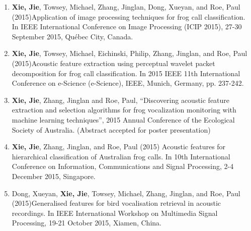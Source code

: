 \begin{enumerate}
\item	\textbf{Xie, Jie}, Towsey, Michael, Zhang, Jinglan, Dong, Xueyan, and Roe, Paul (2015)Application of image processing techniques for frog call classification. In IEEE International Conference on Image Processing (ICIP 2015), 27-30 September 2015, Québec City, Canada.

\item	\textbf{Xie, Jie}, Towsey, Michael, Eichinski, Philip, Zhang, Jinglan, and Roe, Paul (2015)Acoustic feature extraction using perceptual wavelet packet decomposition for frog call classification. In 2015 IEEE 11th International Conference on e-Science (e-Science), IEEE, Munich, Germany, pp. 237-242.

\item	\textbf{Xie, Jie}, Zhang, Jinglan and Roe, Paul,  “Discovering acoustic feature extraction and selection algorithms for frog vocalization monitoring with machine learning techniques”, 2015 Annual Conference of the Ecological Society of Australia. (Abstract accepted for poster presentation) 

\item	\textbf{Xie, Jie}, Zhang, Jinglan, and Roe, Paul (2015) Acoustic features for hierarchical classification of Australian frog calls. In 10th International Conference on Information, Communications and Signal Processing, 2-4 December 2015, Singapore.

\item	Dong, Xueyan, \textbf{Xie, Jie}, Towsey, Michael, Zhang, Jinglan, and Roe, Paul (2015)Generalised features for bird vocalisation retrieval in acoustic recordings. In IEEE International Workshop on Multimedia Signal Processing, 19-21 October 2015, Xiamen, China.

\end{enumerate} 



